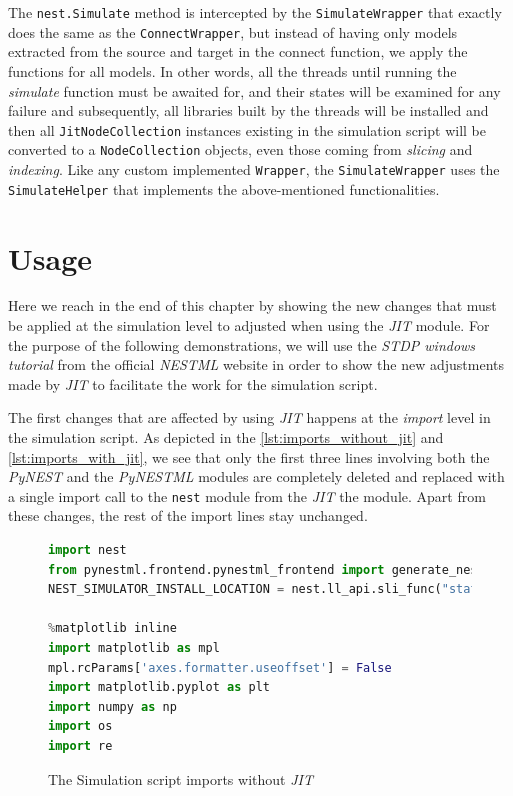The \texttt{nest.Simulate} method is intercepted by the \texttt{SimulateWrapper} that exactly does the same as the \texttt{ConnectWrapper}, but instead of having only models extracted from the source and target in the connect function, we apply the functions for all models. In other words, all the threads until running the \emph{simulate} function must be awaited for, and their states will be examined for any failure and subsequently, all libraries built by the threads will be installed and then all \texttt{JitNodeCollection} instances existing in the simulation script will be converted to a \texttt{NodeCollection} objects, even those coming from \emph{slicing} and \emph{indexing}. Like any custom implemented \texttt{Wrapper}, the \texttt{SimulateWrapper} uses the \texttt{SimulateHelper} that implements the above-mentioned functionalities.






\section{Usage}

Here we reach in the end of this chapter by showing the new changes that must be applied at the simulation level to adjusted when using the \emph{JIT} module.
For the purpose of the following demonstrations, we will use the \emph{STDP windows tutorial} from the official \emph{NESTML} website in order to show the new adjustments made by \emph{JIT} to facilitate the work for the simulation script.

 

The first changes that  are affected by using \emph{JIT} happens at the \emph{import} level in the simulation script. As depicted in the \autoref{lst:imports_without_jit} and \autoref{lst:imports_with_jit}, we see that only the first three lines involving both the \emph{PyNEST} and the \emph{PyNESTML} modules are completely deleted and replaced with a single import call to the \texttt{nest} module from the \emph{JIT} the module. Apart from these changes, the rest of the import lines stay unchanged. 

\begin{figure}[ht!]
\centering
\begin{lstlisting}[language=Python, label=lst:imports_without_jit]
import nest
from pynestml.frontend.pynestml_frontend import generate_nest_target
NEST_SIMULATOR_INSTALL_LOCATION = nest.ll_api.sli_func("statusdict/prefix ::")

%matplotlib inline
import matplotlib as mpl
mpl.rcParams['axes.formatter.useoffset'] = False
import matplotlib.pyplot as plt
import numpy as np
import os
import re

\end{lstlisting}
\caption{The Simulation script imports without \emph{JIT}}
\end{figure}

